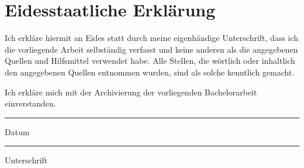 \section*{Eidesstaatliche Erklärung}

Ich erkläre hiermit an Eides statt durch meine eigenhändige Unterschrift, dass ich die vorliegende Arbeit selbständig verfasst und keine anderen als die angegebenen Quellen und Hilfsmittel verwendet habe. Alle Stellen, die wörtlich oder inhaltlich den angegebenen Quellen entnommen wurden, sind als solche kenntlich gemacht.

Ich erkläre mich mit der Archivierung der vorliegenden Bachelorarbeit einverstanden.

\vspace{1.8cm}

\parbox{6cm}{
	\hrule
	\strut \centering\footnotesize Datum
} \hfill
\parbox{6cm}{
	\hrule
	\strut \centering\footnotesize Unterschrift
}